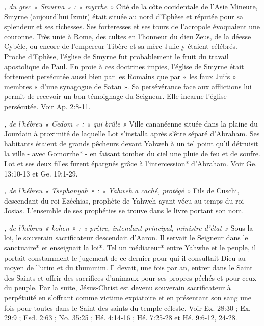\begin{multicols}{2}
{\textit{, du grec « Smurna » : « myrrhe »}\newline
Cité de la côte occidentale de l'Asie Mineure, Smyrne (aujourd'hui Izmir) était située au nord d'Ephèse et réputée pour sa splendeur et ses richesses. Ses forteresses et ses tours de l'acropole évoquaient une couronne. Très unie à Rome, des cultes en l'honneur du dieu Zeus, de la déesse Cybèle, ou encore de l'empereur Tibère et sa mère Julie y étaient célébrés. Proche d'Ephèse, l'église de Smyrne fut probablement le fruit du travail apostolique de Paul. En proie à ces doctrines impies, l'église de Smyrne était fortement persécutée aussi bien par les Romains que par « les faux Juifs » membres « d'une synagogue de Satan ». Sa persévérance face aux afflictions lui permit de recevoir un bon témoignage du Seigneur. Elle incarne l'église persécutée. Voir Ap. 2:8-11.

\textit{, de l'hébreu « Cedom » : « qui brûle »}\newline
Ville cananéenne située dans la plaine du Jourdain à proximité de laquelle Lot s'installa après s'être séparé d'Abraham. Ses habitants étaient de grands pêcheurs devant Yahweh à un tel point qu'il détruisit la ville - avec Gomorrhe* - en faisant tomber du ciel une pluie de feu et de soufre. Lot et ses deux filles furent épargnés grâce à l'intercession* d'Abraham. Voir Ge. 13:10-13 et Ge. 19:1-29.

\textit{, de l'hébreu « Tsephanyah » : « Yahweh a caché, protégé »}\newline
Fils de Cuschi, descendant du roi Ezéchias, prophète de Yahweh ayant vécu au temps du roi Josias. L'ensemble de ses prophéties se trouve dans le livre portant son nom.

\textit{, de l'hébreu « kohen » : « prêtre, intendant principal, ministre d'état »}\newline
Sous la loi, le souverain sacrificateur descendait d'Aaron. Il servait le Seigneur dans le sanctuaire* et enseignait la loi*. Tel un médiateur* entre Yahwhe et le peuple, il portait constamment le jugement de ce dernier pour qui il consultait Dieu au moyen de l'urim et du thummim. Il devait, une fois par an, entrer dans le Saint des Saints et offrir des sacrifices d'animaux pour ses propres péchés et pour ceux du peuple. Par la suite, Jésus-Christ est devenu souverain sacrificateur à perpétuité en s'offrant comme victime expiatoire et en présentant son sang une fois pour toutes dans le Saint des saints du temple céleste. Voir Ex. 28:30 ; Ex. 29:9 ; Esd. 2:63 ; No. 35:25 ; Hé. 4:14-16 ; Hé. 7:25-28 et Hé. 9:6-12, 24-28.

}
\end{multicols}
